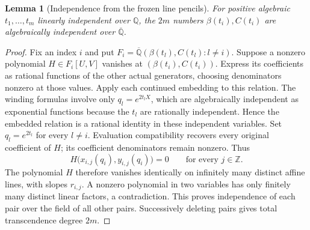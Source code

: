 \documentclass[11pt]{article}
\newtheorem{lemma}[theorem]{Lemma}
\theoremstyle{definition}
\theoremstyle{remark}
\newcommand{\Qa}{\overline{\mathbb Q}}
\begin{document}
\begin{lemma}[Independence from the frozen line pencils]
\label{mbmulti:independence}
For positive algebraic $t_1,\ldots,t_m$ linearly independent over
$\mathbb Q$, the $2m$ numbers $\beta(t_i),C(t_i)$ are algebraically
independent over $\Qa$.
\end{lemma}
\begin{proof}
Fix an index $i$ and put $F_i=\Qa(\beta(t_l),C(t_l):l\ne i)$.
Suppose a nonzero polynomial $H\in F_i[U,V]$ vanishes at
$(\beta(t_i),C(t_i))$. Express its coefficients as rational functions
of the other actual generators, choosing denominators nonzero at those
values. Apply each continued embedding to this relation. The winding
formulas involve only $q_l=e^{2t_lX}$, which are algebraically independent
as exponential functions because the $t_l$ are rationally independent.
Hence the embedded relation is a rational identity in these independent
variables. Set $q_l=e^{2t_l}$ for every $l\ne i$. Evaluation compatibility
recovers every original coefficient of $H$; its coefficient denominators
remain nonzero. Thus
\[
 H\bigl(x_{i,j}(q_i),y_{i,j}(q_i)\bigr)=0
 \qquad\text{for every }j\in\mathbb Z.
\]
The polynomial $H$ therefore vanishes identically on infinitely many
distinct affine lines, with slopes $r_{i,j}$. A nonzero polynomial in
two variables has only finitely many distinct linear factors, a
contradiction. This proves independence of each pair over the field
of all other pairs. Successively deleting pairs gives total
transcendence degree $2m$.
\end{proof}
\end{document}
